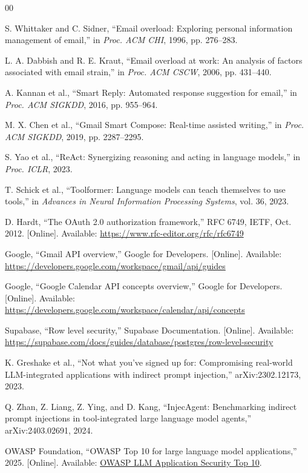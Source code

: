 \documentclass[conference]{IEEEtran}
\begin{document}
\begin{thebibliography}{00}
\small

S. Whittaker and C. Sidner, ``Email overload: Exploring personal information management of email,'' in \emph{Proc. ACM CHI}, 1996, pp. 276--283.

L. A. Dabbish and R. E. Kraut, ``Email overload at work: An analysis of factors associated with email strain,'' in \emph{Proc. ACM CSCW}, 2006, pp. 431--440.

A. Kannan et al., ``Smart Reply: Automated response suggestion for email,'' in \emph{Proc. ACM SIGKDD}, 2016, pp. 955--964.

M. X. Chen et al., ``Gmail Smart Compose: Real-time assisted writing,'' in \emph{Proc. ACM SIGKDD}, 2019, pp. 2287--2295.

S. Yao et al., ``ReAct: Synergizing reasoning and acting in language models,'' in \emph{Proc. ICLR}, 2023.

T. Schick et al., ``Toolformer: Language models can teach themselves to use tools,'' in \emph{Advances in Neural Information Processing Systems}, vol. 36, 2023.

D. Hardt, ``The OAuth 2.0 authorization framework,'' RFC 6749, IETF, Oct. 2012. [Online]. Available: \url{https://www.rfc-editor.org/rfc/rfc6749}

Google, ``Gmail API overview,'' Google for Developers. [Online]. Available: \url{https://developers.google.com/workspace/gmail/api/guides}

Google, ``Google Calendar API concepts overview,'' Google for Developers. [Online]. Available: \url{https://developers.google.com/workspace/calendar/api/concepts}

Supabase, ``Row level security,'' Supabase Documentation. [Online]. Available: \url{https://supabase.com/docs/guides/database/postgres/row-level-security}

K. Greshake et al., ``Not what you've signed up for: Compromising real-world LLM-integrated applications with indirect prompt injection,'' arXiv:2302.12173, 2023.

Q. Zhan, Z. Liang, Z. Ying, and D. Kang, ``InjecAgent: Benchmarking indirect prompt injections in tool-integrated large language model agents,'' arXiv:2403.02691, 2024.

OWASP Foundation, ``OWASP Top 10 for large language model applications,'' 2025. [Online]. Available: \href{https://owasp.org/www-project-top-10-for-large-language-model-applications/}{OWASP LLM Application Security Top 10}.

\end{thebibliography}
\end{document}
